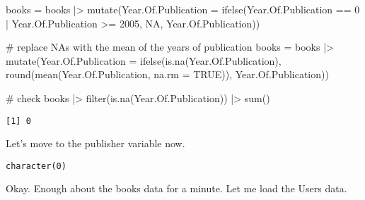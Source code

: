 \documentclass[
]{report}
\newenvironment{Shaded}{\begin{snugshade}}{\end{snugshade}}
\newcommand{\AttributeTok}[1]{\textcolor[rgb]{0.40,0.45,0.13}{#1}}
\newcommand{\CommentTok}[1]{\textcolor[rgb]{0.37,0.37,0.37}{#1}}
\newcommand{\ConstantTok}[1]{\textcolor[rgb]{0.56,0.35,0.01}{#1}}
\newcommand{\DecValTok}[1]{\textcolor[rgb]{0.68,0.00,0.00}{#1}}
\newcommand{\DocumentationTok}[1]{\textcolor[rgb]{0.37,0.37,0.37}{\textit{#1}}}
\newcommand{\FunctionTok}[1]{\textcolor[rgb]{0.28,0.35,0.67}{#1}}
\newcommand{\NormalTok}[1]{\textcolor[rgb]{0.00,0.23,0.31}{#1}}
\newcommand{\OtherTok}[1]{\textcolor[rgb]{0.00,0.23,0.31}{#1}}
\newcommand{\SpecialCharTok}[1]{\textcolor[rgb]{0.37,0.37,0.37}{#1}}
\begin{document}
\begin{Shaded}
\begin{Highlighting}[]
\NormalTok{books }\OtherTok{=}\NormalTok{ books }\SpecialCharTok{|\textgreater{}}
  \FunctionTok{mutate}\NormalTok{(}\AttributeTok{Year.Of.Publication =} \FunctionTok{ifelse}\NormalTok{(Year.Of.Publication }\SpecialCharTok{==} \DecValTok{0} \SpecialCharTok{|}\NormalTok{ Year.Of.Publication }\SpecialCharTok{\textgreater{}=} \DecValTok{2005}\NormalTok{, }\ConstantTok{NA}\NormalTok{, Year.Of.Publication))}

\CommentTok{\# replace NAs with the mean of the years of publication }
\NormalTok{books }\OtherTok{=}\NormalTok{ books }\SpecialCharTok{|\textgreater{}}
  \FunctionTok{mutate}\NormalTok{(}\AttributeTok{Year.Of.Publication =} \FunctionTok{ifelse}\NormalTok{(}\FunctionTok{is.na}\NormalTok{(Year.Of.Publication),}
                                      \FunctionTok{round}\NormalTok{(}\FunctionTok{mean}\NormalTok{(Year.Of.Publication, }\AttributeTok{na.rm =} \ConstantTok{TRUE}\NormalTok{)), }
\NormalTok{                                      Year.Of.Publication))}

\CommentTok{\# check }
\NormalTok{books }\SpecialCharTok{|\textgreater{}} \FunctionTok{filter}\NormalTok{(}\FunctionTok{is.na}\NormalTok{(Year.Of.Publication)) }\SpecialCharTok{|\textgreater{}} \FunctionTok{sum}\NormalTok{()}
\end{Highlighting}
\end{Shaded}

\begin{verbatim}
[1] 0
\end{verbatim}

Let's move to the publisher variable now.

\begin{Shaded}
\end{Shaded}

\begin{verbatim}
character(0)
\end{verbatim}

Okay. Enough about the books data for a minute. Let me load the Users
data.
\end{document}
